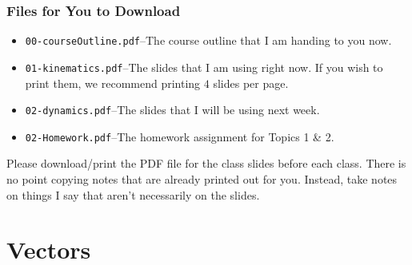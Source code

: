 \documentclass[12pt,compress,aspectratio=169]{beamer}
\begin{document}
\begin{frame}
  \titlepage
\end{frame}

\begin{frame}
  \frametitle{Files for You to Download}
  \begin{itemize}
  \item\texttt{00-courseOutline.pdf}--The course outline that I am handing to
    you now.
  \item\texttt{01-kinematics.pdf}--The slides that I am using right now. If
    you wish to print them, we recommend printing $4$ slides per page.
  \item\texttt{02-dynamics.pdf}--The slides that I will be using next week.
  \item\texttt{02-Homework.pdf}--The homework assignment for Topics 1 \& 2.
  \end{itemize}
  Please download/print the PDF file for the class slides before each class.
  There is no point copying notes that are already printed out for you.
  Instead, take notes on things I say that aren't necessarily on the slides.
\end{frame}



\section{Vectors}
\end{document}

